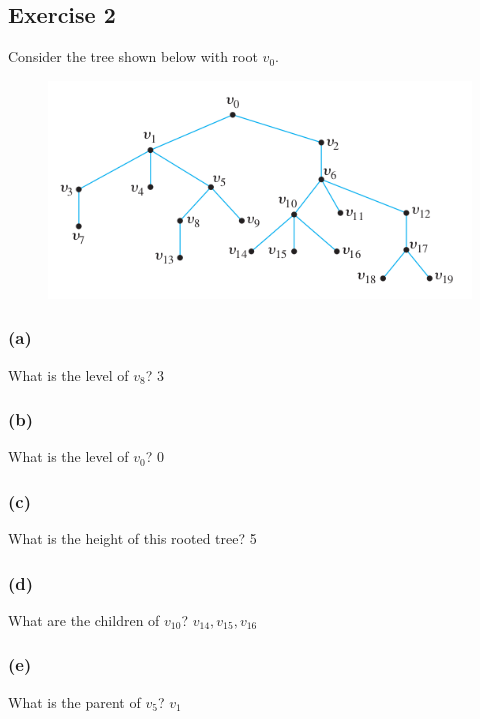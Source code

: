 \documentclass[14pt]{extarticle}
\begin{document}
\subsection{Exercise 2}
Consider the tree shown below with root \(v_0\).

\begin{figure}[ht!]
\centering
\includegraphics[scale=0.5]{../images/10.5.2.png}
\end{figure}

\subsubsection{(a)}
What is the level of \(v_8\)? \hspace{2cm}{\it Proof.} 3

\subsubsection{(b)}
What is the level of \(v_0\)? \hspace{2cm}{\it Proof.} 0

\subsubsection{(c)}
What is the height of this rooted tree?
\hspace{2cm}{\it Proof.} 5

\subsubsection{(d)}
What are the children of \(v_{10}\)?
\hspace{2cm}{\it Proof.} \(v_{14}, v_{15}, v_{16}\)

\subsubsection{(e)}
What is the parent of \(v_5\)?
\hspace{2cm}{\it Proof.} \(v_1\)
\end{document}
